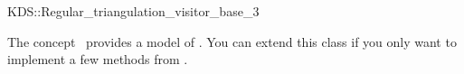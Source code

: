

\begin{ccRefClass}{KDS::Regular_triangulation_visitor_base_3}


\ccDefinition
  
The concept \ccRefName\ provides a model of
. You can extend this class if you only
want to implement a few methods from .

\ccIsModel


\ccCreation
{}  %


\ccSeeAlso



\end{ccRefClass}


